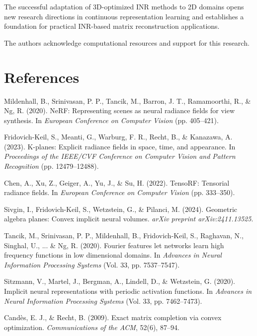 \documentclass{article}
\begin{document}
The successful adaptation of 3D-optimized INR methods to 2D domains opens new research directions in continuous representation learning and establishes a foundation for practical INR-based matrix reconstruction applications.

\begin{ack}
The authors acknowledge computational resources and support for this research.
\end{ack}

\section*{References}

\begin{thebibliography}{99}

Mildenhall, B., Srinivasan, P. P., Tancik, M., Barron, J. T., Ramamoorthi, R., \& Ng, R. (2020). NeRF: Representing scenes as neural radiance fields for view synthesis. In \emph{European Conference on Computer Vision} (pp. 405--421).

Fridovich-Keil, S., Meanti, G., Warburg, F. R., Recht, B., \& Kanazawa, A. (2023). K-planes: Explicit radiance fields in space, time, and appearance. In \emph{Proceedings of the IEEE/CVF Conference on Computer Vision and Pattern Recognition} (pp. 12479--12488).

Chen, A., Xu, Z., Geiger, A., Yu, J., \& Su, H. (2022). TensoRF: Tensorial radiance fields. In \emph{European Conference on Computer Vision} (pp. 333--350).

Sivgin, I., Fridovich-Keil, S., Wetzstein, G., \& Pilanci, M. (2024). Geometric algebra planes: Convex implicit neural volumes. \emph{arXiv preprint arXiv:2411.13525}.

Tancik, M., Srinivasan, P. P., Mildenhall, B., Fridovich-Keil, S., Raghavan, N., Singhal, U., ... \& Ng, R. (2020). Fourier features let networks learn high frequency functions in low dimensional domains. In \emph{Advances in Neural Information Processing Systems} (Vol. 33, pp. 7537--7547).

Sitzmann, V., Martel, J., Bergman, A., Lindell, D., \& Wetzstein, G. (2020). Implicit neural representations with periodic activation functions. In \emph{Advances in Neural Information Processing Systems} (Vol. 33, pp. 7462--7473).

Candès, E. J., \& Recht, B. (2009). Exact matrix completion via convex optimization. \emph{Communications of the ACM}, 52(6), 87--94.


\end{thebibliography}
\end{document}
